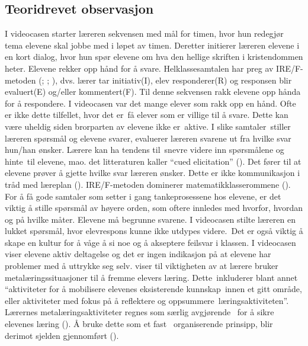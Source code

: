 \documentclass[12pt,twoside,onecolumn,norsk]{article}
\begin{document}
\subsection*{Teoridrevet observasjon}
I videocasen starter læreren sekvensen med mål for timen, hvor hun redegjør tema 
elevene skal jobbe med i løpet av timen. Deretter initierer læreren elevene i en kort 
dialog, hvor hun spør elevene om hva den hellige skriften i kristendommen heter. 
Elevene rekker opp hånd for å svare. Helklassesamtalen har preg av IRE/F-metoden 
(; ; ), 
dvs. lærer tar initiativ(I), elev responderer(R) og responsen blir evaluert(E) 
og/eller kommentert(F). Til denne sekvensen rakk elevene opp hånda for å respondere. 
I videocasen var det mange elever som rakk opp en hånd. Ofte er ikke dette tilfellet, 
hvor det er få elever som er villige til å svare. Dette kan være uheldig siden 
brorparten av elevene ikke er aktive. I slike samtaler stiller læreren spørsmål og 
elevene svarer, evaluerer læreren svarene ut fra hvilke svar hun/han ønsker. Lærere kan 
ha tendens til snevre videre inn spørsmålene og hinte til elevene, mao. det 
litteraturen kaller ``cued elicitation'' (). Det fører til at 
elevene prøver å gjette hvilke svar læreren ønsker. Dette er ikke kommunikasjon i tråd
med læreplan (). IRE/F-metoden dominerer matematikklasserommene 
(). For å få gode samtaler som setter i gang tankeprosessene hos 
elevene, er det viktig å stille spørsmål av høyere orden, som oftere innledes med 
hvorfor, hvordan og på hvilke måter. Elevene må begrunne svarene. I videocasen stilte 
læreren en lukket spørsmål, hvor elevrespons kunne ikke utdypes videre. Det er også 
viktig å skape en kultur for å våge å si noe og å akseptere feilsvar i klassen. I 
videocasen viser elevene aktiv deltagelse og det er ingen indikasjon på at elevene har 
problemer med å uttrykke seg selv.
\newline
\newline
{} viser til viktigheten av at lærere bruker metalæringssituasjoner til å 
fremme elevers læring. Dette inkluderer blant annet ``aktiviteter for å mobilisere elevenes 
eksisterende kunnskap innen et gitt område, eller aktiviteter med fokus på å reflektere og oppsummere læringsaktiviteten''. Lærernes metalæringsaktiviteter regnes som særlig avgjørende 
for å sikre elevenes læring (). Å bruke dette som et fast 
organiserende prinsipp, blir derimot sjelden gjennomført (). 
\end{document}
